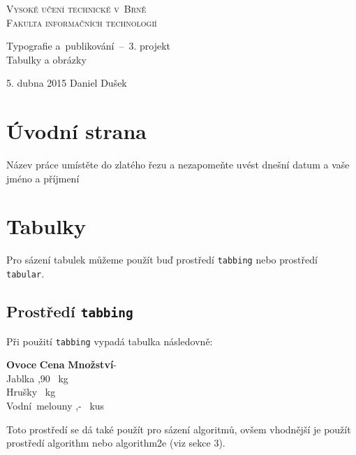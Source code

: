 \documentclass[a4paper, 11pt]{article}
\begin{document}
\thispagestyle{empty}
\begin{center}
	\Huge
	\textsc{Vysoké učení technické v~Brně\\\vspace{-0.10cm}\huge{Fakulta informačních technologií}}\\
	\LARGE
		
		\LARGE{Typografie a~publikování \,--\ 3. projekt}\\\vspace{-0.05cm}\Huge{Tabulky a obrázky}
	
	{\Large 5. dubna 2015 \hfill Daniel Dušek }
\end{center}

\newpage


\section{Úvodní strana}
Název práce umístěte do zlatého řezu a nezapomeňte uvést dnešní datum a vaše jméno a příjmení

\section{Tabulky}
Pro sázení tabulek můžeme použít buď prostředí \verb|tabbing| nebo prostředí \verb|tabular|.
	
	\subsection{Prostředí \texttt{tabbing}}
	Při použití \verb|tabbing| vypadá tabulka následovně:

	\begin{tabbing}

	\textbf{Ovoce} \quad \hspace{1.2cm} \= \textbf{Cena} \hspace{0.3cm} \= \textbf{Množství}- \\
	Jablka ,90 ~kg \\
	Hrušky  ~kg \\
	Vodní~melouny ,- ~kus \\

	\end{tabbing}

Toto prostředí se dá také použít pro sázení algoritmů, ovšem vhodnější je použít prostředí algorithm nebo algorithm2e (viz sekce 3).
\end{document}
